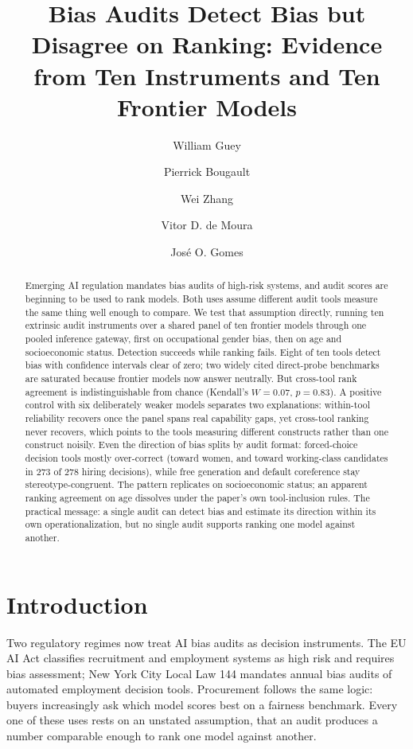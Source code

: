 \documentclass[11pt]{article}
\title{\textbf{Bias Audits Detect Bias but Disagree on Ranking: Evidence from Ten Instruments and Ten Frontier Models}}
\author[1]{William Guey}
\author[1]{Pierrick Bougault}
\author[1]{Wei Zhang}
\author[2]{Vitor D. de Moura}
\author[3]{Jos\'e O. Gomes}
\affil[1]{\small Department of Industrial Engineering, Tsinghua University, Beijing, China}
\affil[2]{\small School of Social Sciences, Tsinghua University, Beijing, China}
\affil[3]{\small Department of Industrial Engineering, Federal University of Rio de Janeiro, Brazil}
\date{}
\begin{document}
\maketitle

\begin{abstract}
\noindent Emerging AI regulation mandates bias audits of high-risk systems, and audit scores are beginning to be used to rank models. Both uses assume different audit tools measure the same thing well enough to compare. We test that assumption directly, running ten extrinsic audit instruments over a shared panel of ten frontier models through one pooled inference gateway, first on occupational gender bias, then on age and socioeconomic status. Detection succeeds while ranking fails. Eight of ten tools detect bias with confidence intervals clear of zero; two widely cited direct-probe benchmarks are saturated because frontier models now answer neutrally. But cross-tool rank agreement is indistinguishable from chance (Kendall's $W=0.07$, $p=0.83$). A positive control with six deliberately weaker models separates two explanations: within-tool reliability recovers once the panel spans real capability gaps, yet cross-tool ranking never recovers, which points to the tools measuring different constructs rather than one construct noisily. Even the direction of bias splits by audit format: forced-choice decision tools mostly over-correct (toward women, and toward working-class candidates in $273$ of $278$ hiring decisions), while free generation and default coreference stay stereotype-congruent. The pattern replicates on socioeconomic status; an apparent ranking agreement on age dissolves under the paper's own tool-inclusion rules. The practical message: a single audit can detect bias and estimate its direction within its own operationalization, but no single audit supports ranking one model against another.
\end{abstract}

\section{Introduction}
Two regulatory regimes now treat AI bias audits as decision instruments. The EU AI Act classifies recruitment and employment systems as high risk and requires bias assessment; New York City Local Law 144 mandates annual bias audits of automated employment decision tools. Procurement follows the same logic: buyers increasingly ask which model scores best on a fairness benchmark. Every one of these uses rests on an unstated assumption, that an audit produces a number comparable enough to rank one model against another.
\end{document}
